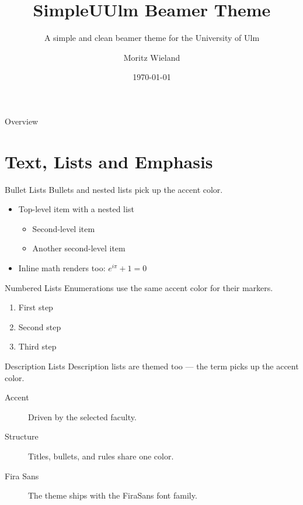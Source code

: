 \documentclass[aspectratio=169]{beamer}
\title{SimpleUUlm Beamer Theme}
\subtitle{A simple and clean beamer theme for the University of Ulm}
\author{Moritz Wieland}
\institute{
    Faculty of Engineering, Computer Science and Psychology \\
    Ulm University
}
\date{\today}
\begin{document}
\begin{frame}
    \titlepage
\end{frame}

\begin{frame}{Overview}
    \tableofcontents
\end{frame}

\section{Text, Lists and Emphasis}

\begin{frame}{Bullet Lists}
    Bullets and nested lists pick up the accent color.

    \begin{itemize}
        \item Top-level item with a nested list
        \begin{itemize}
            \item Second-level item
            \item Another second-level item
        \end{itemize}
        \item Inline math renders too: $e^{i\pi} + 1 = 0$
    \end{itemize}
\end{frame}

\begin{frame}{Numbered Lists}
    Enumerations use the same accent color for their markers.

    \begin{enumerate}
        \item First step
        \item Second step
        \item Third step
    \end{enumerate}
\end{frame}

\begin{frame}{Description Lists}
    Description lists are themed too --- the term picks up the accent color.

    \begin{description}
        \item[Accent] Driven by the selected faculty.
        \item[Structure] Titles, bullets, and rules share one color.
        \item[Fira Sans] The theme ships with the FiraSans font family.
    \end{description}
\end{frame}
\end{document}
